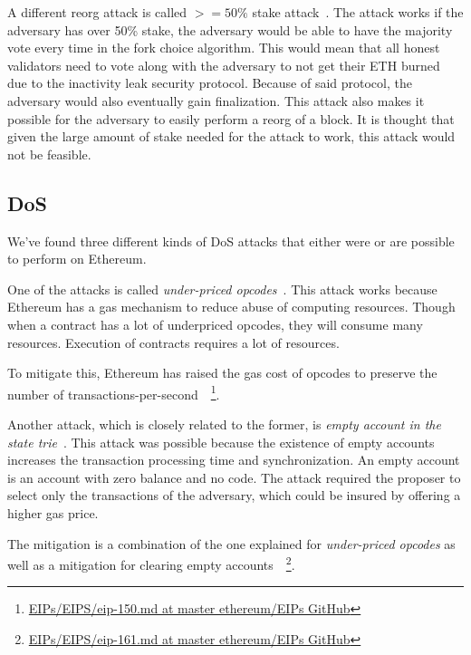 A different reorg attack is called $>=50\%$ stake attack~\cite{EthereumAttackDefense2024}.
The attack works if the adversary has over 50\% stake, the adversary would be able to have the majority vote every time in the fork choice algorithm.
This would mean that all honest validators need to vote along with the adversary to not get their ETH burned due to the inactivity leak security protocol.
Because of said protocol, the adversary would also eventually gain finalization.
This attack also makes it possible for the adversary to easily perform a reorg of a block.
It is thought that given the large amount of stake needed for the attack to work, this attack would not be feasible.



\subsection{DoS}\label{subsec:dos}
We've found three different kinds of DoS attacks that either were or are possible to perform on Ethereum.

One of the attacks is called \textit{under-priced opcodes}~\cite{10.1145/3391195,9815256}.
This attack works because Ethereum has a gas mechanism to reduce abuse of computing resources.
Though when a contract has a lot of underpriced opcodes, they will consume many resources.
Execution of contracts requires a lot of resources.

To mitigate this,
Ethereum has raised the gas cost of opcodes
to preserve the number of transactions-per-second~\cite{Opcode-mitigation}~\footnote{
\href{https://github.com/ethereum/EIPs/blob/master/EIPS/eip-150.md}{EIPs/EIPS/eip-150.md at master ethereum/EIPs GitHub}}.

Another attack,
which is closely related to the former, is \textit{empty account in the state trie}~\cite{10.1145/3391195,9815256}.
This attack was possible
because the existence of empty accounts increases the transaction processing time and synchronization.
An empty account is an account with zero balance and no code.
The attack required the proposer to select only the transactions of the adversary,
which could be insured by offering a higher gas price.

The mitigation is a combination of the one
explained for \textit{under-priced opcodes} as well as a mitigation
for clearing empty accounts~\cite{Opcode-mitigation,empty-account-mitigation,empty-account-eip-mitigation}~\footnote{
\href{https://github.com/ethereum/EIPs/blob/master/EIPS/eip-161.md}{EIPs/EIPS/eip-161.md at master ethereum/EIPs GitHub}}.

